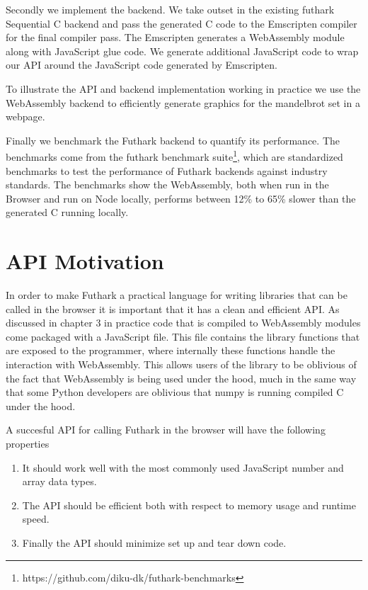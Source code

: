 \documentclass[11pt]{book}
\begin{document}
Secondly we implement the backend. We take outset in the existing futhark Sequential C backend and pass the generated C code to the Emscripten compiler for the final compiler pass. The Emscripten generates a WebAssembly module along with JavaScript glue code. We generate additional JavaScript code to wrap our API around the JavaScript code generated by Emscripten.

To illustrate the API and backend implementation working in practice we use the WebAssembly backend to efficiently generate graphics for the mandelbrot set in a webpage.

Finally we benchmark the Futhark backend to quantify its performance. The benchmarks come from the futhark benchmark suite\footnote{https://github.com/diku-dk/futhark-benchmarks}, which are standardized benchmarks to test the performance of Futhark backends against industry standards. The benchmarks show the WebAssembly, both when run in the Browser and run on Node locally, performs between 12\% to 65\% slower than the generated C running locally. 

\section{API Motivation}

In order to make Futhark a practical language for writing libraries that can be called in the browser it is important that it has a clean and efficient API. As discussed in chapter 3 in practice code that is compiled to WebAssembly modules come packaged with a JavaScript file. This file contains the library functions that are exposed to the programmer, where internally these functions handle the interaction with WebAssembly. This allows users of the library to be oblivious of the fact that WebAssembly is being used under the hood, much in the same way that some Python developers are oblivious that numpy is running compiled C under the hood.

A succesful API for calling Futhark in the browser will have the following properties
\begin{enumerate}
    \item It should work well with the most commonly used JavaScript number and array data types.
    \item The API should be efficient both with respect to memory usage and runtime speed.
    \item Finally the API should minimize set up and tear down code.
\end{enumerate}
\end{document}
